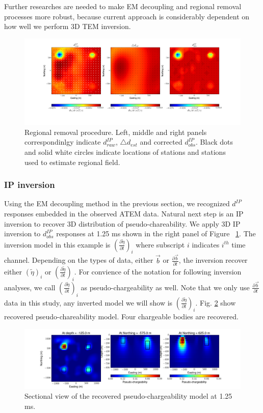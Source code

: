 \documentclass[letterpaper,11pt]{article}
\renewcommand {\b}  { {\vec b} }
\newcommand{\peta}{\tilde{\eta}}
\newcommand{\petadt}{\frac{\partial \tilde{\eta}}{\partial t}}
\newcommand{\dip}{d^{IP}}
\newcommand{\dbdt}{\frac{\partial \b}{\partial t}}
\begin{document}
Further researches are needed to make EM decoupling and regional removal processes more robust, because current approach is considerably dependent on how well we perform 3D TEM inversion. 

\begin{figure}[htb]
  \centering
  \includegraphics[width=1.0\textwidth]{figures/RegRem_field_1_25ms.png}
  \caption{Regional removal procedure. Left, middle and right panels correspondinlgy indicate $\dip_{raw}$, $\triangle d_{est}$ and corrected $\dip_{obs}$. Black dots and solid white circles indicate locations of stations and stations used to estimate regional field.}
  \label{Fig:regremove}
\end{figure}

\subsubsection{IP inversion}
Using the EM decoupling method in the previous section, we recognized $\dip$ responses embedded in the observed ATEM data. Natural next step is an IP inversion to recover 3D distribution of pseudo-chareability. We apply 3D IP inversion to $\dip_{obs}$ responses at 1.25 ms shown in the right panel of Figure ~\ref{Fig:regremove}. The inversion model in this example is $(\petadt)_i$ where subscript $i$ indicates $i^{th}$ time channel. Depending on the types of data, either $\b$ or $\dbdt$, the inversion recover either $(\peta)_i$ or $(\petadt)_i$. For convience of the notation for following inversion analyses, we call $(\petadt)_i$ as pseudo-chargeability as well. Note that we only use $\dbdt$ data in this study, any inverted model we will show is $(\petadt)_i$.
Fig. \ref{Fig:petaestmodel_syn} show recovered pseudo-chareability model. Four chargeable bodies are recovered. 

\begin{figure}[htb]
  \centering
  \includegraphics[width=1.0\textwidth]{figures/Petaest_reg_1_25ms.png}
  \caption{Sectional view of the recovered pseudo-chargeability model at 1.25 ms.}
  \label{Fig:petaestmodel_syn}
\end{figure}
\end{document}
